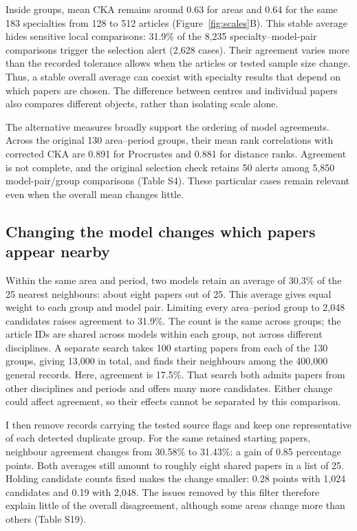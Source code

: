 \documentclass[12pt]{article}
\begin{document}
Inside groups, mean CKA remains around 0.63 for areas and 0.64 for the same 183 specialties from 128 to 512 articles (Figure~\ref{fig:scales}B). This stable average hides sensitive local comparisons: 31.9\% of the 8,235 specialty--model-pair comparisons trigger the selection alert (2,628 cases). Their agreement varies more than the recorded tolerance allows when the articles or tested sample size change. Thus, a stable overall average can coexist with specialty results that depend on which papers are chosen. The difference between centres and individual papers also compares different objects, rather than isolating scale alone.

The alternative measures broadly support the ordering of model agreements. Across the original 130 area--period groups, their mean rank correlations with corrected CKA are 0.891 for Procrustes and 0.881 for distance ranks. Agreement is not complete, and the original selection check retains 50 alerts among 5,850 model-pair/group comparisons (Table S4). These particular cases remain relevant even when the overall mean changes little.

\FloatBarrier
\subsection{Changing the model changes which papers appear nearby}
Within the same area and period, two models retain an average of 30.3\% of the 25 nearest neighbours: about eight papers out of 25. This average gives equal weight to each group and model pair. Limiting every area--period group to 2,048 candidates raises agreement to 31.9\%. The count is the same across groups; the article IDs are shared across models within each group, not across different disciplines. A separate search takes 100 starting papers from each of the 130 groups, giving 13,000 in total, and finds their neighbours among the 400,000 general records. Here, agreement is 17.5\%. That search both admits papers from other disciplines and periods and offers many more candidates. Either change could affect agreement, so their effects cannot be separated by this comparison.

I then remove records carrying the tested source flags and keep one representative of each detected duplicate group. For the same retained starting papers, neighbour agreement changes from 30.58\% to 31.43\%: a gain of 0.85 percentage points. Both averages still amount to roughly eight shared papers in a list of 25. Holding candidate counts fixed makes the change smaller: 0.28 points with 1,024 candidates and 0.19 with 2,048. The issues removed by this filter therefore explain little of the overall disagreement, although some areas change more than others (Table S19).
\end{document}
